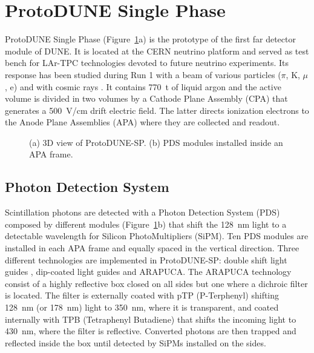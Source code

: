 \documentclass[a4paper]{article}
\begin{document}
\section{ProtoDUNE Single Phase}
ProtoDUNE Single Phase \cite{dunecollaboration2021design} (Figure~\ref{fig:pdune}a) is the prototype of the first far detector module of DUNE. It is located at the CERN neutrino platform and served as test bench for LAr-TPC technologies devoted to future neutrino experiments. Its response has been studied during Run 1 with a beam of various particles ($\pi$, K, $\mu$, e) and with cosmic rays \cite{Abi_2020}. It contains \SI{770}{\tonne} of liquid argon  and the active volume is divided in two volumes by a Cathode Plane Assembly (CPA) that generates a \SI{500}{\volt/\centi\meter} drift electric field. The latter directs ionization electrons to the Anode Plane Assemblies (APA) where they are collected and readout.

\begin{figure}
    \centering
    \caption{(a) 3D view of ProtoDUNE-SP. (b) PDS modules installed inside an APA frame.}
    \label{fig:pdune}
\end{figure}

\subsection{Photon Detection System}
Scintillation photons are detected with a Photon Detection System (PDS) composed by different modules (Figure~\ref{fig:pdune}b) that shift the \SI{128}{\nano\meter} light to a detectable wavelength for Silicon PhotoMultipliers (SiPM). 
Ten PDS modules are installed in each APA frame and equally spaced in the vertical direction. Three different technologies are implemented in ProtoDUNE-SP: double shift light guides \cite{HOWARD20189}, dip-coated light guides \cite{Moss_2015} and ARAPUCA. The ARAPUCA \cite{Machado_2016,Segreto_2018,Totani_2020} technology consist of a highly reflective box closed on all sides but one where a dichroic filter is located. The filter is externally coated with pTP (P-Terphenyl) shifting \SI{128}{\nano\meter} (or \SI{178}{\nano\meter}) light to \SI{350}{\nano\meter}, where it is transparent, and coated internally with TPB (Tetraphenyl Butadiene) that shifts the incoming light to \SI{430}{\nano\meter}, where the filter is reflective. Converted photons are then trapped and reflected inside the box until detected by SiPMs installed on the sides.
\end{document}
